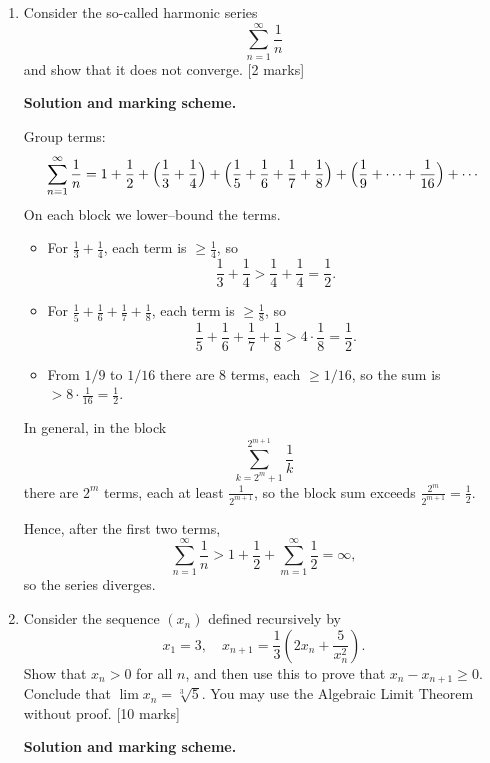 \documentclass{article}
\begin{document}
\begin{enumerate}[label=(\alph*)]
    \item Consider the so-called harmonic series
    \[
    \sum_{n=1}^\infty \frac{1}{n}
    \]
    and show that it does not converge. [2 marks]

    \begin{mdframed}[linecolor=black, linewidth=1pt]
    \textbf{Solution and marking scheme.}
    
    Group terms:
    \[
    \sum_{n=1}^\infty \frac{1}{n}
    = 1 + \frac12
    + \Bigl(\frac13 + \frac14\Bigr)
    + \Bigl(\frac15 + \frac16 + \frac17 + \frac18\Bigr)
    + \Bigl(\frac19 + \cdots + \frac1{16}\Bigr) + \cdots
    \]
    On each block we lower–bound the terms.
    
    \begin{itemize}
      \item For $\frac13+\frac14$, each term is $\ge \frac14$, so
      \[
      \frac13 + \frac14 > \frac14 + \frac14 = \frac12.
      \]
      \item For $\frac15+\frac16+\frac17+\frac18$, each term is $\ge \frac18$, so
      \[
      \frac15+\frac16+\frac17+\frac18 > 4\cdot\frac18 = \frac12.
      \]
      \item From $1/9$ to $1/16$ there are $8$ terms, each $\ge 1/16$, so the sum is $>8\cdot\frac1{16}=\frac12$.
    \end{itemize}
    
    In general, in the block
    \[
    \sum_{k=2^m+1}^{2^{m+1}} \frac{1}{k}
    \]
    there are $2^m$ terms, each at least $\frac{1}{2^{m+1}}$, so the block sum exceeds $\frac{2^m}{2^{m
    +1}} = \frac{1}{2}$.
    
    Hence, after the first two terms,
    \[
    \sum_{n=1}^\infty \frac{1}{n}
    > 1 + \frac12 + \sum_{m=1}^\infty \frac12 = \infty,
    \]
    so the series diverges.
    \end{mdframed}

    \item Consider the sequence \((x_n)\) defined recursively by  
    \[
    x_1 = 3, \quad x_{n+1} = \frac{1}{3}\left(2x_n + \frac{5}{x_n^2}\right).
    \]
    Show that $x_n > 0$ for all $n$, and then use this to prove that $x_n - x_{n+1} \ge 0$. Conclude that $\lim x_n = \sqrt[3]{5}$.
    You may use the Algebraic Limit Theorem without proof. [10 marks]

    \begin{mdframed}[linecolor=black, linewidth=1pt]
    \textbf{Solution and marking scheme.}
    

\end{mdframed}
\end{enumerate}
\end{document}
